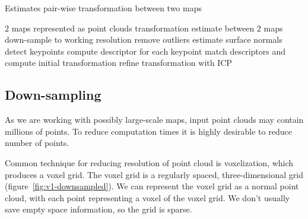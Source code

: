 \begin{algorithm}
    \caption[Pair-wise transformation estimation]{Estimates pair-wise transformation between two maps}
    \label{alg:estimate-pair}
    \begin{algorithmic}[1]
        \Require $2$ maps represented as point clouds
        \Ensure transformation estimate between $2$ maps
            \State down-sample to working resolution
            \State remove outliers
            \State estimate surface normals
            \State detect keypoints
            \State compute descriptor for each keypoint
            \State match descriptors and compute initial transformation
            \State refine transformation with \gls{ICP}
        \EndProcedure
    \end{algorithmic}
\end{algorithm}

\subsection{Down-sampling}
\label{sec:downsampling}

As we are working with possibly large-scale maps, input point clouds may contain millions of points. To reduce computation times it is highly desirable to reduce number of points.

Common technique for reducing resolution of point cloud is voxelization, which produces a voxel grid. The voxel grid is a regularly spaced, three-dimensional grid (figure~\ref{fig:v1-downsampled}). We can represent the voxel grid as a normal point cloud, with each point representing a voxel of the voxel grid. We don't usually save empty space information, so the grid is sparse.

